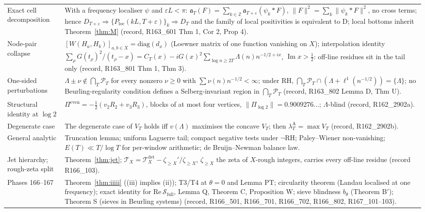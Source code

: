\documentclass[11pt]{amsart}
\theoremstyle{definition}
\theoremstyle{remark}
\newcommand{\Z}{\mathbb Z}
\newcommand{\Iml}{\operatorname{Im}}
\newcommand{\PT}{\mathcal P_T}
\newcommand{\lamA}{\lambda^{\mathrm A}_T}
\begin{document}
\begin{longtable}{@{}p{4.2cm}p{10.3cm}@{}}
Exact cell decomposition & With a frequency localiser $\psi$ and $\varepsilon L<\pi$: $\mathfrak a_T(F)=\sum_{k\in\Z}\mathfrak a_{T+\varepsilon}(\psi_k*F)$, $\|F\|^2=\sum_k\|\psi_k*F\|^2$, no cross terms; hence $D_{T+\varepsilon}\Rightarrow\{P_{\mathrm{loc}}(kL,T+\varepsilon)\}_k\Rightarrow D_T$ and the family of local positivities is equivalent to D; local bottoms inherit Theorem~\ref{thm:M} (record, R163\_601 Thm 1, Cor 2, Prop 4). \\
Node-pair collapse & $[W(H_a,H_b)]_{a,b\in X}=\mathrm{diag}(d_x)$ (Loewner matrix of one function vanishing on $X$); interpolation identity $\sum_\rho G(t_\rho)^2/(t_\rho-x)=C_T(x)-iG(x)^2\sum_{\log n\ge2T}\Lambda(n)n^{-1/2+ix}$, $\Iml x>\frac12$: off-line residues sit in the tail only (record, R163\_801 Thm 1, Thm 3). \\
One-sided perturbations & $\Lambda\pm\nu\notin\bigcap_T\PT$ for every nonzero $\nu\ge0$ with $\sum\nu(n)n^{-1/2}<\infty$; under RH, $\bigcap_T\PT\cap(\Lambda+\ell^1(n^{-1/2}))=\{\Lambda\}$; no Beurling-regularity condition defines a Selberg-invariant region in $\bigcap_T\PT$ (record, R163\_802 Lemma D, Thm U). \\
Structural identity at $\log2$ & $\Pi^{\mathrm{even}}=-\frac12(v_2R_2+v_3R_3)$, blocks of at most four vertices, $\|\Pi_{\log2}\|=0.9009276\ldots$; $\Lambda$-blind (record, R162\_2902a). \\
Degenerate case & The degenerate case of $V_T$ holds iff $v(\Lambda)$ maximises the concave $V_T$; then $\lamA=\max V_T$ (record, R162\_2902b). \\
General analytic & Truncation lemma; uniform Laguerre tail; compact negative tests under $\neg$RH; Paley--Wiener non-vanishing; $E(T)\ll T/\log T$ for per-window arithmetic; de Bruijn--Newman balance law. \\
Jet hierarchy; rough-zeta split & Theorem~\ref{thm:jet}; $\mathcal T_X=\mathcal T^{\mathrm{det}}_X-\zeta_{\ge X}'/\zeta_{\ge X}$, $\zeta_{\ge X}$ the zeta of $X$-rough integers, carries every off-line residue (record R166\_103). \\
Phases 166--167 & Theorem~\ref{thm:iiiii} ((iii) implies (ii)); T3/T4 at $\theta=0$ and Lemma PT; circularity theorem (Landau localised at one frequency); exact identity for $\mathrm{Re}\,\mathcal S_{\mathrm{full}}$, Lemma Q, Theorem C, Proposition W; sieve blindness $b_\theta$ (Theorem B$'$); Theorem S (sieves in Beurling systems) (record, R166\_501, R166\_701, R166\_702, R166\_802, R167\_101--103). \\
\end{longtable}
\end{document}
